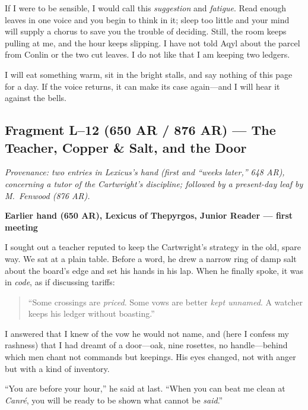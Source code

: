 \documentclass[11pt]{article}
\begin{document}
If I were to be sensible, I would call this \emph{suggestion} and \emph{fatigue}. Read enough leaves in one voice and you begin to think in it; sleep too little and your mind will supply a chorus to save you the trouble of deciding. Still, the room keeps pulling at me, and the hour keeps slipping. I have not told Aqyl about the parcel from Conlin or the two cut leaves. I do not like that I am keeping two ledgers.

I will eat something warm, sit in the bright stalls, and say nothing of this page for a day. If the voice returns, it can make its case again—and I will hear it against the bells.

\subsection{Fragment L--12 (650 AR / 876 AR) --- The Teacher, Copper \& Salt, and the Door}
\label{frag:l12}
{}

\noindent\textit{Provenance: two entries in Lexicus’s hand (first and “weeks later,” 648 AR), concerning a tutor of the Cartwright’s discipline; followed by a present-day leaf by M.\ Fenwood (876 AR).}

\medskip
\noindent\textbf{Earlier hand (650 AR), Lexicus of Thepyrgos, Junior Reader — first meeting}

I sought out a teacher reputed to keep the Cartwright’s strategy in the old, spare way. We sat at a plain table. Before a word, he drew a narrow ring of damp salt about the board’s edge and set his hands in his lap. When he finally spoke, it was in \emph{code}, as if discussing tariffs:

\begin{quote}\small
“Some crossings are \emph{priced}. Some vows are better \emph{kept unnamed}. A watcher keeps his ledger without boasting.”
\end{quote}

I answered that I knew of the vow he would not name, and (here I confess my rashness) that I had dreamt of a door—oak, nine rosettes, no handle—behind which men chant not commands but keepings. His eyes changed, not with anger but with a kind of inventory.

“You are before your hour,” he said at last. “When you can beat me clean at \textit{Canr\'e}, you will be ready to be shown what cannot be \emph{said}.”
\end{document}
